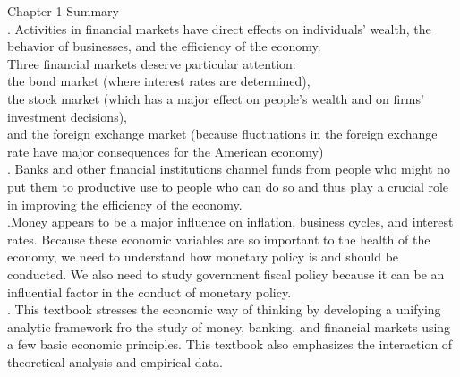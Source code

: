 \documentclass[12pt]{article}
\begin{document}
\newpage

Chapter 1 Summary\\


. Activities in financial markets have direct effects on individuals' wealth, the behavior of businesses, and the efficiency of the economy.\\
Three financial markets deserve particular attention: \\
the bond market (where interest rates are determined),\\
the stock market (which has a major effect on people's wealth and on firms' investment decisions),\\
and the foreign exchange market (because fluctuations in the foreign exchange rate have major consequences for the American economy)\\

. Banks and other financial institutions channel funds from people who might no put them to productive use to people who can do so
and thus play a crucial role in improving the efficiency of the economy.\\

 .Money appears to be a major influence on inflation, business cycles, and interest rates. Because these economic variables are so important to 
the health of the economy, we need to understand how monetary policy is and should be conducted. We also need to study government fiscal policy
because it can be an influential factor in the conduct of monetary policy. \\

. This textbook stresses the economic way of thinking by developing a unifying analytic framework fro the study of money, banking, and financial
markets using a few basic economic principles. This textbook also emphasizes the interaction of theoretical analysis and empirical data.\\
\end{document}
